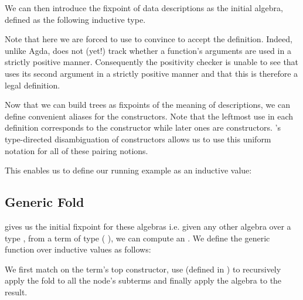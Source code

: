 
We can then introduce the fixpoint of data descriptions as the initial
algebra, defined as the following inductive type.



Note that here we are forced to use \assertTotal{} to convince \idris{}
to accept the definition.
%
Indeed, unlike Agda, \idris{} does not (yet!) track whether a function's
arguments are used in a strictly positive manner.
%
Consequently the positivity checker
is unable to see that  uses its second
argument in a strictly positive manner
and that this is therefore a legal definition.

Now that we can build trees as fixpoints of the
meaning of descriptions, we can define convenient aliases for
the  constructors.
%
Note that the leftmost \IdrisData{(\#)} use in each definition corresponds
to the  constructor while later ones are 
constructors.
%
\idris{}'s type-directed disambiguation of constructors allows us to use
this uniform notation for all of these pairing notions.

\noindent
\begin{minipage}[t]{.3\textwidth}
\end{minipage}\hfill
\begin{minipage}[t]{.65\textwidth}
\end{minipage}

This enables us to define our running example as an inductive value:


\subsection{Generic Fold}\label{sec:genericfoldinductive}

 gives us the initial fixpoint for these algebras i.e.
given any other algebra over a type , from a term of
type ( ), we can compute an .
%
We define the generic  function over inductive values
as follows:


We first match on the term's top constructor, use 
(defined in )
to recursively apply the fold to all the node's subterms and finally
apply the algebra to the result.

